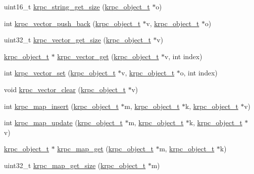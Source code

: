 \begin{DoxyCompactItemize}
uint16\+\_\+t \hyperlink{group__rpc_ga1de7973df219a3f8d3f466d27ba8c080}{krpc\+\_\+string\+\_\+get\+\_\+size} (\hyperlink{struct__krpc__object__t}{krpc\+\_\+object\+\_\+t} $\ast$o)
\item 
int \hyperlink{group__rpc_gac870fa910b5e155c9f566ead4fac2b54}{krpc\+\_\+vector\+\_\+push\+\_\+back} (\hyperlink{struct__krpc__object__t}{krpc\+\_\+object\+\_\+t} $\ast$v, \hyperlink{struct__krpc__object__t}{krpc\+\_\+object\+\_\+t} $\ast$o)
\item 
uint32\+\_\+t \hyperlink{group__rpc_gac86bb807e52193aaa69ce6fe36cd59c8}{krpc\+\_\+vector\+\_\+get\+\_\+size} (\hyperlink{struct__krpc__object__t}{krpc\+\_\+object\+\_\+t} $\ast$v)
\item 
\hyperlink{struct__krpc__object__t}{krpc\+\_\+object\+\_\+t} $\ast$ \hyperlink{group__rpc_ga0291a0548378269354fc614712f4c31e}{krpc\+\_\+vector\+\_\+get} (\hyperlink{struct__krpc__object__t}{krpc\+\_\+object\+\_\+t} $\ast$v, int index)
\item 
int \hyperlink{group__rpc_gaf08956a35d983893f382974abcfca177}{krpc\+\_\+vector\+\_\+set} (\hyperlink{struct__krpc__object__t}{krpc\+\_\+object\+\_\+t} $\ast$v, \hyperlink{struct__krpc__object__t}{krpc\+\_\+object\+\_\+t} $\ast$o, int index)
\item 
void \hyperlink{group__rpc_ga02d5eeffe865f129911f42ffbfa0d119}{krpc\+\_\+vector\+\_\+clear} (\hyperlink{struct__krpc__object__t}{krpc\+\_\+object\+\_\+t} $\ast$v)
\item 
int \hyperlink{group__rpc_ga252615bf3ff115656c3c155a7c9fafaf}{krpc\+\_\+map\+\_\+insert} (\hyperlink{struct__krpc__object__t}{krpc\+\_\+object\+\_\+t} $\ast$m, \hyperlink{struct__krpc__object__t}{krpc\+\_\+object\+\_\+t} $\ast$k, \hyperlink{struct__krpc__object__t}{krpc\+\_\+object\+\_\+t} $\ast$v)
\item 
int \hyperlink{group__rpc_gace78d56aa68df141f3cfa90ecf012b81}{krpc\+\_\+map\+\_\+update} (\hyperlink{struct__krpc__object__t}{krpc\+\_\+object\+\_\+t} $\ast$m, \hyperlink{struct__krpc__object__t}{krpc\+\_\+object\+\_\+t} $\ast$k, \hyperlink{struct__krpc__object__t}{krpc\+\_\+object\+\_\+t} $\ast$v)
\item 
\hyperlink{struct__krpc__object__t}{krpc\+\_\+object\+\_\+t} $\ast$ \hyperlink{group__rpc_ga87ce3d17030c66e3264fa2e026bfaf33}{krpc\+\_\+map\+\_\+get} (\hyperlink{struct__krpc__object__t}{krpc\+\_\+object\+\_\+t} $\ast$m, \hyperlink{struct__krpc__object__t}{krpc\+\_\+object\+\_\+t} $\ast$k)
\item 
uint32\+\_\+t \hyperlink{group__rpc_gad760f8fec813dab474ac011d7aab1e7e}{krpc\+\_\+map\+\_\+get\+\_\+size} (\hyperlink{struct__krpc__object__t}{krpc\+\_\+object\+\_\+t} $\ast$m)

\end{DoxyCompactItemize}
